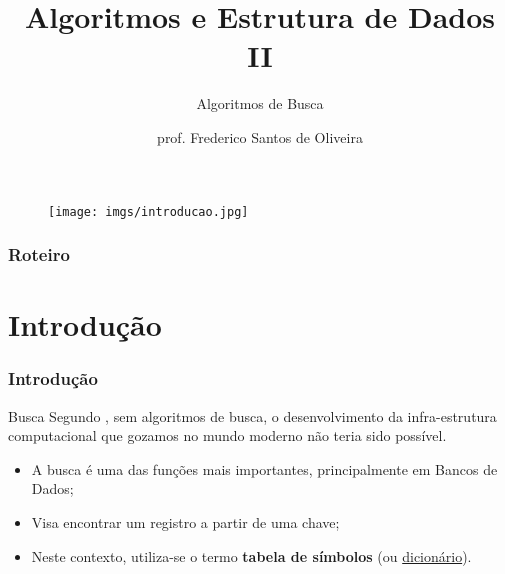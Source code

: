 \documentclass[aspectratio=169]{beamer}
\title[Algoritmos de Busca]{Algoritmos e Estrutura de Dados II}
\subtitle{Algoritmos de Busca}
\author[Frederico Santos de Oliveira]{prof. Frederico Santos de Oliveira}
\institute[UFMT]{Universidade Federal de Mato Grosso\\ Instituto de Engenharia}
\date{}
\begin{document}
\begin{frame}
\titlepage %

\begin{figure}[!h]
  \centering
  \texttt{[image: imgs/introducao.jpg]}
  \label{fig_introducao}
\end{figure}
\end{frame}


\begin{frame}
\frametitle{Roteiro} %
\tableofcontents %
\end{frame}


\section{Introdução} %

\begin{frame}
\frametitle{Introdução}
\begin{block}{Busca}
 Segundo , sem algoritmos de busca, o desenvolvimento da infra-estrutura computacional que gozamos no mundo moderno não teria sido possível.
\end{block}
\begin{itemize}
\item A busca é uma das funções mais importantes, principalmente em Bancos de Dados;
\item Visa encontrar um registro a partir de uma chave;
\item Neste contexto, utiliza-se o termo {\bf tabela de símbolos} (ou \underline{dicionário}).
\end{itemize}
\end{frame}
\end{document}
